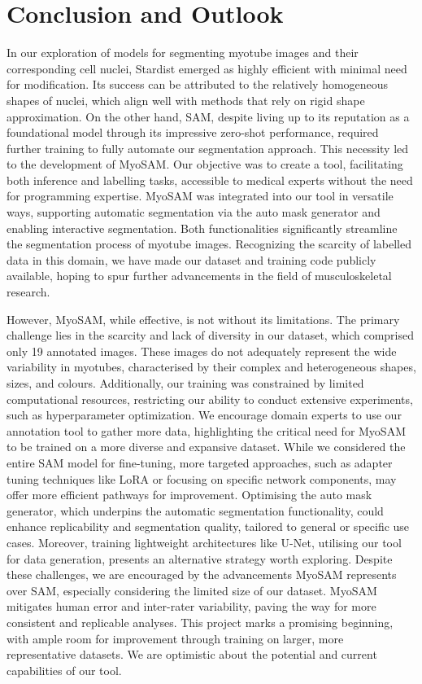 \section{Conclusion and Outlook}
In our exploration of models for segmenting myotube images and their corresponding cell nuclei, Stardist emerged as highly efficient with minimal need for modification. Its success can be attributed to the relatively homogeneous shapes of nuclei, which align well with methods that rely on rigid shape approximation. On the other hand, SAM, despite living up to its reputation as a foundational model through its impressive zero-shot performance, required further training to fully automate our segmentation approach. This necessity led to the development of MyoSAM. Our objective was to create a tool, facilitating both inference and labelling tasks, accessible to medical experts without the need for programming expertise. MyoSAM was integrated into our tool in versatile ways, supporting automatic segmentation via the auto mask generator and enabling interactive segmentation. Both functionalities significantly streamline the segmentation process of myotube images. Recognizing the scarcity of labelled data in this domain, we have made our dataset and training code publicly available, hoping to spur further advancements in the field of musculoskeletal research.

However, MyoSAM, while effective, is not without its limitations. The primary challenge lies in the scarcity and lack of diversity in our dataset, which comprised only 19 annotated images. These images do not adequately represent the wide variability in myotubes, characterised by their complex and heterogeneous shapes, sizes, and colours. Additionally, our training was constrained by limited computational resources, restricting our ability to conduct extensive experiments, such as hyperparameter optimization.
We encourage domain experts to use our annotation tool to gather more data, highlighting the critical need for MyoSAM to be trained on a more diverse and expansive dataset. While we considered the entire SAM model for fine-tuning, more targeted approaches, such as adapter tuning techniques like LoRA or focusing on specific network components, may offer more efficient pathways for improvement. Optimising the auto mask generator, which underpins the automatic segmentation functionality, could enhance replicability and segmentation quality, tailored to general or specific use cases. Moreover, training lightweight architectures like U-Net, utilising our tool for data generation, presents an alternative strategy worth exploring.
Despite these challenges, we are encouraged by the advancements MyoSAM represents over SAM, especially considering the limited size of our dataset. MyoSAM mitigates human error and inter-rater variability, paving the way for more consistent and replicable analyses. This project marks a promising beginning, with ample room for improvement through training on larger, more representative datasets. We are optimistic about the potential and current capabilities of our tool.
